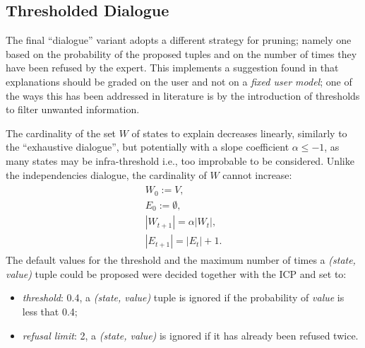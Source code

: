 \subsection{Thresholded Dialogue}
The final \enquote{dialogue} variant adopts a different strategy for pruning; namely one based on the probability of the proposed tuples and on the number of times they have been refused by the expert.
This implements a suggestion found in \citet{lacave2002review} that explanations should be graded on the user and not on a \textit{fixed user model}; one of the ways this has been addressed in literature is by the introduction of thresholds to filter unwanted information.

The cardinality of the set $W$ of states to explain decreases linearly, similarly to the \enquote{exhaustive dialogue}, but potentially with a slope coefficient $\alpha \leq -1$, as many states may be infra-threshold i.e., too improbable to be considered.
Unlike the independencies dialogue, the cardinality of $W$ cannot increase:
\begin{align}
\begin{split}
	W_0 := V, \\
	E_0 := \emptyset, \\
	|W_{t+1}| = \alpha |W_t|, \\
	|E_{t+1}| = |E_t| + 1.
\end{split}
\end{align}
The default values for the threshold and the maximum number of times a \textit{(state, value)} tuple could be proposed were decided together with the ICP and set to:
\begin{itemize}
  \item \textit{threshold}: 0.4, a \textit{(state, value)} tuple is ignored if the probability of \textit{value} is less that 0.4;
  \item \textit{refusal limit}: 2, a \textit{(state, value)} is ignored if it has already been refused twice.
\end{itemize}